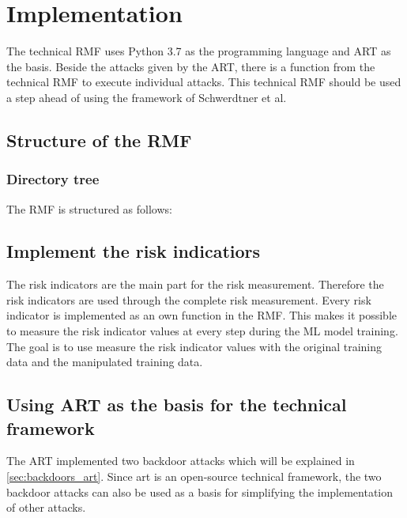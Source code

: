 \section{Implementation}
\label{sec:implementation}

The technical RMF uses Python 3.7 as the programming language and ART as the basis. Beside the attacks given by the ART, there is a function from the technical RMF to execute individual attacks. This technical RMF should be used a step ahead of using the framework of Schwerdtner et al.

\subsection{Structure of the RMF}

\subsubsection*{Directory tree}

The RMF is structured as follows:


\subsection{Implement the risk indicatiors}

The risk indicators are the main part for the risk measurement. Therefore the risk indicators are used through the complete risk measurement. Every risk indicator is implemented as an own function in the RMF. This makes it possible to measure the risk indicator values at every step during the ML model training. The goal is to use measure the risk indicator values with the original training data and the manipulated training data.

\subsection{Using ART as the basis for the technical framework}

The ART implemented two backdoor attacks which will be explained in \ref{sec:backdoors_art}. Since art is an open-source technical framework, the two backdoor attacks can also be used as a basis for simplifying the implementation of other attacks.

